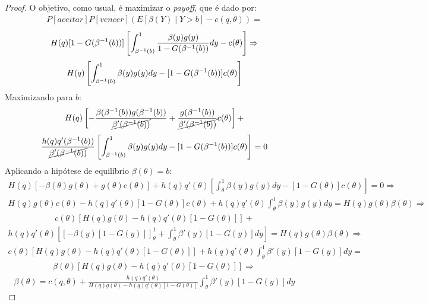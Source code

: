 \begin{proof}
	O objetivo, como usual, é maximizar o \emph{payoff}, que é dado por:
	\begin{align*}
		P[aceitar]P[vencer](E[\beta(Y) \mid Y > b]-c(q,\theta)) = 
	\end{align*}
	\begin{align*}
		H(q)[1-G(\beta^{-1}(b))] \left[ \int_{\beta^{-1}(b)}^1 \frac{\beta(y)g(y)}{1-G(\beta^{-1}(b))}dy - c(\theta) \right] \Rightarrow
	\end{align*}
	\begin{align*}
		H(q) \left[ \int_{\beta^{-1}(b)}^1 \beta(y)g(y)dy - [1-G(\beta^{-1}(b))]c(\theta) \right]
	\end{align*}
	Maximizando para $b$:
	\begin{align*}
		H(q) \left[ -\frac{\beta(\beta^{-1}(b))g(\beta^{-1}(b))}{\cancel{\beta'(\beta^{-1}(b))}} + \frac{g(\beta^{-1}(b))}{\cancel{\beta'(\beta^{-1}(b))}}c(\theta) \right] +
	\end{align*}
	\begin{align*}
		\frac{h(q)q'(\beta^{-1}(b))}{\cancel{\beta'(\beta^{-1}(b))}} \left[ \int_{\beta^{-1}(b)}^1 \beta(y)g(y)dy - [1-G(\beta^{-1}(b))]c(\theta) \right] = 0
	\end{align*}
	Aplicando a hipótese de equilíbrio $\beta(\theta) = b$:
	\begin{align*}
		H(q) \left[ -\beta(\theta)g(\theta) + g(\theta)c(\theta) \right] + h(q)q'(\theta) \left[ \int_{\theta}^1 \beta(y)g(y)dy - [1-G(\theta)]c(\theta) \right] = 0 \Rightarrow
	\end{align*}
	\begin{align*}
		H(q)g(\theta)c(\theta)-h(q)q'(\theta)[1-G(\theta)]c(\theta) + h(q)q'(\theta) \int_{\theta}^1 \beta(y)g(y)dy = H(q)g(\theta)\beta(\theta) \Rightarrow
	\end{align*}
	\begin{align*}
		c(\theta)[H(q)g(\theta)-h(q)q'(\theta)[1-G(\theta)]] +
	\end{align*}
	\begin{align*} h(q)q'(\theta) \left[ [-\beta(y)[1-G(y)]]_{\theta}^1 + \int_{\theta}^1 \beta'(y)[1-G(y)]dy \right] = H(q)g(\theta)\beta(\theta) \Rightarrow
	\end{align*}
	\begin{align*}
		c(\theta)[H(q)g(\theta)-h(q)q'(\theta)[1-G(\theta)]] + h(q)q'(\theta) \int_{\theta}^1 \beta'(y)[1-G(y)]dy =
	\end{align*}
 	\begin{align*}
		\beta(\theta)[H(q)g(\theta) - h(q)q'(\theta)[1-G(\theta)]] \Rightarrow
	\end{align*}
	\begin{align*}
		\beta(\theta) = c(q,\theta) + \frac{h(q)q'(\theta)}{H(q)g(\theta) - h(q)q'(\theta)[1-G(\theta)]} \int_{\theta}^1 \beta'(y)[1-G(y)]dy
	\end{align*}
\end{proof}

